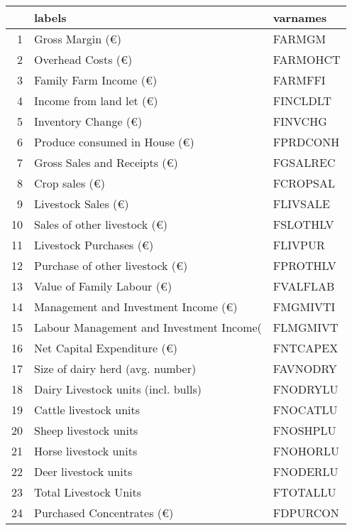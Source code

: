 \documentclass{article}\usepackage{graphicx, color}
\begin{document}
\begin{flushleft}
\newpage
\begin{table}[ht]
\begin{center}
\begin{tabular}{rll}
  \hline
 & labels & varnames \\ 
  \hline
1 & Gross Margin                     (€) & FARMGM \\ 
  2 & Overhead Costs                   (€) & FARMOHCT \\ 
  3 & Family Farm Income               (€) & FARMFFI \\ 
  4 & Income from land let             (€) & FINCLDLT \\ 
  5 & Inventory Change                 (€) & FINVCHG \\ 
  6 & Produce consumed in House        (€) & FPRDCONH \\ 
  7 & Gross Sales and Receipts         (€) & FGSALREC \\ 
  8 & Crop sales                       (€) & FCROPSAL \\ 
  9 & Livestock Sales                  (€) & FLIVSALE \\ 
  10 & Sales of other livestock         (€) & FSLOTHLV \\ 
  11 & Livestock Purchases              (€) & FLIVPUR \\ 
  12 & Purchase of other livestock      (€) & FPROTHLV \\ 
  13 & Value of Family Labour           (€) & FVALFLAB \\ 
  14 & Management and Investment Income (€) & FMGMIVTI \\ 
  15 & Labour Management and Investment Income( & FLMGMIVT \\ 
  16 & Net Capital Expenditure          (€) & FNTCAPEX \\ 
  17 & Size of dairy herd  (avg. number) & FAVNODRY \\ 
  18 & Dairy Livestock units (incl. bulls) & FNODRYLU \\ 
  19 & Cattle livestock units & FNOCATLU \\ 
  20 & Sheep livestock units & FNOSHPLU \\ 
  21 & Horse livestock units & FNOHORLU \\ 
  22 & Deer livestock units & FNODERLU \\ 
  23 & Total Livestock Units & FTOTALLU \\ 
  24 & Purchased Concentrates      (€) & FDPURCON \\ 

\end{tabular}
\end{center}
\end{table}
\end{flushleft}
\end{document}
